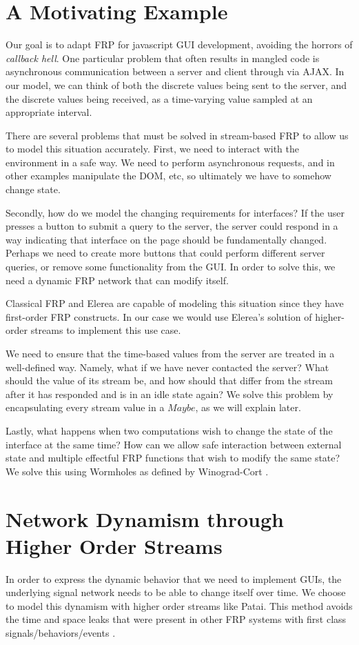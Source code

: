 \documentclass[twocolumn,11pt,english]{article}
\begin{document}
\section{A Motivating Example}
Our goal is to adapt FRP for javascript GUI development, avoiding the horrors of \textit{callback hell}. One particular problem that often results in mangled code is asynchronous communication between a server and client through via AJAX. In our model, we can think of both the discrete values being sent to the server, and the discrete values being received, as a time-varying value sampled at an appropriate interval. 

There are several problems that must be solved in stream-based FRP to allow us to model this situation accurately. First, we need to interact with the environment in a safe way. We need to perform asynchronous requests, and in other examples manipulate the DOM, etc, so ultimately we have to somehow change state. 

Secondly, how do we model the changing requirements for interfaces? If the user presses a button to submit a query to the server, the server could respond in a way indicating that interface on the page should be fundamentally changed. Perhaps we need to create more buttons that could perform different server queries, or remove some functionality from the GUI. In order to solve this, we need a dynamic FRP network that can modify itself. 

Classical FRP and Elerea are capable of modeling this situation since they have first-order FRP constructs. In our case we would use Elerea's solution of higher-order streams to implement this use case. 

We need to ensure that the time-based values from the server are treated in a well-defined way. Namely, what if we have never contacted the server? What should the value of its stream be, and how should that differ from the stream after it has responded and is in an idle state again? We solve this problem by encapsulating every stream value in a $Maybe$, as we will explain later. 

Lastly, what happens when two computations wish to change the state of the interface at the same time? How can we allow safe interaction between external state and multiple effectful FRP functions that wish to modify the same state? We solve this using Wormholes as defined by Winograd-Cort \cite{WinogradCort2012HS}.

\section{Network Dynamism through Higher Order Streams}
In order to express the dynamic behavior that we need to implement GUIs, the underlying signal network needs to be able to change itself over time. We choose to model this dynamism with higher order streams like Patai\cite{HighOrderStreams}. This method avoids the time and space leaks that were present in other FRP systems with first class signals/behaviors/events \cite{ElliottHudak97:Fran}. 
\end{document}
